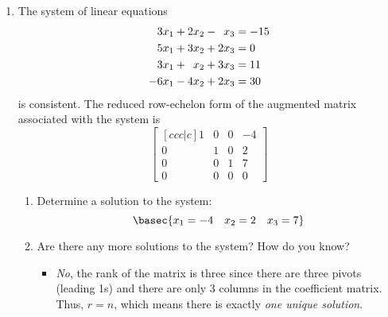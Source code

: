\documentclass[basic]{inVerba-notes}
\begin{document}
\begin{enumerate}\color{minor}
  \item The system of linear equations
  \begin{align*}
    \hphantom{-}3x_1 + 2x_2 - \hphantom{2}x_3   &= -15 \\
    \hphantom{-}5x_1 + 3x_2 + 2x_3  &= 0 \\
    \hphantom{-}3x_1 + \hphantom{2}x_2 + 3x_3 &= 11 \\
    -6x_1 - 4x_2 + 2x_3 &=  30
\end{align*}
is consistent. The reduced row-echelon form of the augmented matrix associated with the system is
\[%
\begin{bmatrix}[ccc|c]
  1 & 0 & 0 & -4 \\
  0 & 1 & 0 & 2 \\
  0 & 0 & 1 & 7 \\
  0 & 0 & 0 & 0
\end{bmatrix}
\]%
\begin{enumerate}
  \item Determine a solution to the system:
  \[%
  \basec{x_1=-4 \quad x_2 = 2 \quad x_3 = 7}
  \]%
  \item Are there any more solutions to the system? How do you know?
    \begin{itemize}\color{text}
      \item \emph{No}, the rank of the matrix is three since there are three pivots (leading 1s) and there are only 3 columns in the coefficient matrix. Thus, \emph{\(r = n\)}, which means there is exactly \emph{one unique solution}. 
    \end{itemize}
\end{enumerate}

\vspace{36pt}


\end{enumerate}
\end{document}
